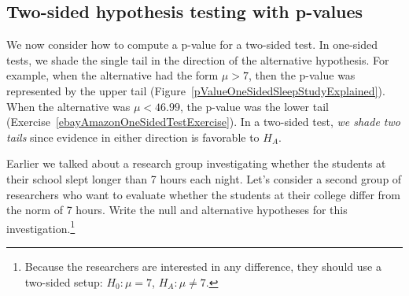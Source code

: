 \subsection{Two-sided hypothesis testing with p-values}
\label{twoSidedTestsWithPValues}


We now consider how to compute a p-value for a two-sided test. In one-sided tests, we shade the single tail in the direction of the alternative hypothesis. For example, when the alternative had the form $\mu > 7$, then the p-value was represented by the upper tail (Figure~\ref{pValueOneSidedSleepStudyExplained}). When the alternative was $\mu < 46.99$, the p-value was the lower tail (Exercise~\ref{ebayAmazonOneSidedTestExercise}). In a two-sided test, \emph{we shade two tails} since evidence in either direction is favorable to $H_A$.

\begin{exercise} \label{2ndSchSleepHypSetupExercise}
Earlier we talked about a research group investigating whether the students at their school slept longer than 7 hours each night. Let's consider a second group of researchers who want to evaluate whether the students at their college differ from the norm of 7 hours. Write the null and alternative hypotheses for this investigation.\footnote{Because the researchers are interested in any difference, they should use a two-sided setup: $H_0: \mu = 7$, $H_A: \mu \neq 7$.}
\end{exercise}

